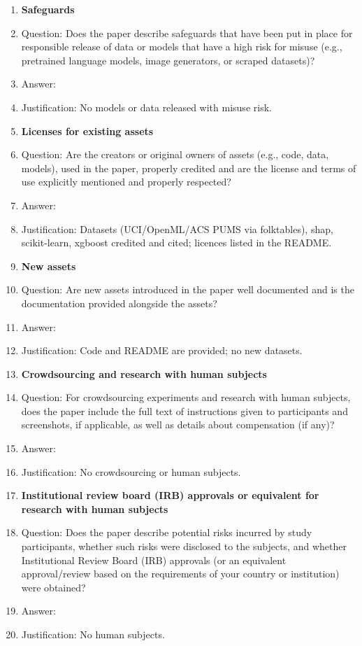 \begin{enumerate}
\item {\bf Safeguards}
 \item[] Question: Does the paper describe safeguards that have been put in place for responsible release of data or models that have a high risk for misuse (e.g., pretrained language models, image generators, or scraped datasets)?
 \item[] Answer: \answerNA{}
 \item[] Justification: No models or data released with misuse risk.

\item {\bf Licenses for existing assets}
 \item[] Question: Are the creators or original owners of assets (e.g., code, data, models), used in the paper, properly credited and are the license and terms of use explicitly mentioned and properly respected?
 \item[] Answer: \answerYes{}
 \item[] Justification: Datasets (UCI/OpenML/ACS PUMS via folktables), shap, scikit-learn, xgboost credited and cited; licences listed in the README.

\item {\bf New assets}
 \item[] Question: Are new assets introduced in the paper well documented and is the documentation provided alongside the assets?
 \item[] Answer: \answerYes{}
 \item[] Justification: Code and README are provided; no new datasets.

\item {\bf Crowdsourcing and research with human subjects}
 \item[] Question: For crowdsourcing experiments and research with human subjects, does the paper include the full text of instructions given to participants and screenshots, if applicable, as well as details about compensation (if any)? 
 \item[] Answer: \answerNA{}
 \item[] Justification: No crowdsourcing or human subjects.

\item {\bf Institutional review board (IRB) approvals or equivalent for research with human subjects}
 \item[] Question: Does the paper describe potential risks incurred by study participants, whether such risks were disclosed to the subjects, and whether Institutional Review Board (IRB) approvals (or an equivalent approval/review based on the requirements of your country or institution) were obtained?
 \item[] Answer: \answerNA{}
 \item[] Justification: No human subjects.


\end{enumerate}
